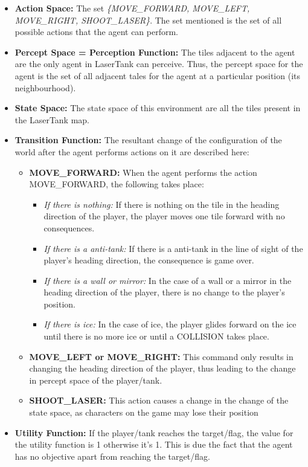 \documentclass[11pt,a4paper,noindent]{article}
\begin{document}

\begin{itemize}
    \item \textbf{Action Space:} The set \emph{\{MOVE\_FORWARD, MOVE\_LEFT, MOVE\_RIGHT, SHOOT\_LASER\}}. The set mentioned is the set of all possible actions that the agent can perform.
    \item \textbf{Percept Space = Perception Function:} The tiles adjacent to the agent are the only agent in {\sc LaserTank} can perceive. Thus, the percept space for the agent is the set of all adjacent tales for the agent at a particular position (its neighbourhood).
    \item \textbf{State Space:} The state space of this environment are all the tiles present in the {\sc LaserTank} map.
    \item \textbf{Transition Function:} The resultant change of the configuration of the world after the agent performs actions on it are described here:
    \begin{itemize}
        \item \textbf{MOVE\_FORWARD:} When the agent performs the action MOVE\_FORWARD, the following takes place:
        \begin{itemize}
            \item \emph{If there is nothing:} If there is nothing on the tile in the heading direction of the player, the player moves one tile forward with no consequences.
            \item \emph{If there is a anti-tank:} If there is a anti-tank in the line of sight of the player's heading direction, the consequence is game over.
            \item \emph{If there is a wall or mirror:} In the case of a wall or a mirror in the heading direction of the player, there is no change to the player's position.
            \item \emph{If there is ice:} In the case of ice, the player glides forward on the ice until there is no more ice or until a COLLISION takes place.
        \end{itemize}
        \item \textbf{MOVE\_LEFT or MOVE\_RIGHT:} This command only results in changing the heading direction of the player, thus leading to the change in percept space of the player/tank.
        \item \textbf{SHOOT\_LASER:} This action causes a change in the change of the state space, as characters on the game may lose their position
    \end{itemize}
    \item \textbf{Utility Function:} If the player/tank reaches the target/flag, the value for the utility function is 1 otherwise it's 1. This is due the fact that the agent has no objective apart from reaching the target/flag.
\end{itemize}
\end{document}
